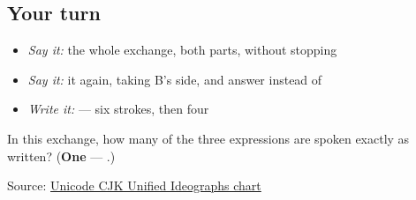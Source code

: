 \subsection*{Your turn}
\begin{itemize}
\raggedright
  \item \emph{Say it:} the whole exchange, both parts, without stopping
  \item \emph{Say it:} it again, taking B's side, and answer  instead of 
  \item \emph{Write it:}  — six strokes, then four
\end{itemize}

\begin{tcolorbox}[breakable,colback=teal!4,colframe=teal!35!black,title={Before you move on}]
In this exchange, how many of the three expressions are spoken exactly as written? (\textbf{One} — .)

Source: \href{https://www.unicode.org/charts/PDF/U4E00.pdf}{Unicode CJK Unified Ideographs chart}
\end{tcolorbox}
